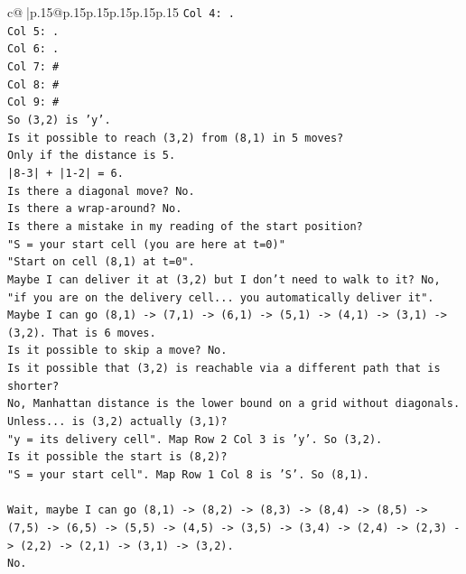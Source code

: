 \documentclass{article}
\begin{document}
{\begin{supertabular}{c@{$\;$}|p{.15\linewidth}@{}p{.15\linewidth}p{.15\linewidth}p{.15\linewidth}p{.15\linewidth}p{.15\linewidth}}
{{{\texttt{Col 4: .} \\
\texttt{Col 5: .} \\
\texttt{Col 6: .} \\
\texttt{Col 7: \#} \\
\texttt{Col 8: \#} \\
\texttt{Col 9: \#} \\
\texttt{So (3,2) is 'y'.} \\
\texttt{Is it possible to reach (3,2) from (8,1) in 5 moves?} \\
\texttt{Only if the distance is 5.} \\
\texttt{|8{-}3| + |1{-}2| = 6.} \\
\texttt{Is there a diagonal move? No.} \\
\texttt{Is there a wrap{-}around? No.} \\
\texttt{Is there a mistake in my reading of the start position?} \\
\texttt{"S = your start cell (you are here at t=0)"} \\
\texttt{"Start on cell (8,1) at t=0".} \\
\texttt{Maybe I can deliver it at (3,2) but I don't need to walk to it? No, "if you are on the delivery cell... you automatically deliver it".} \\
\texttt{Maybe I can go (8,1) {-}> (7,1) {-}> (6,1) {-}> (5,1) {-}> (4,1) {-}> (3,1) {-}> (3,2). That is 6 moves.} \\
\texttt{Is it possible to skip a move? No.} \\
\texttt{Is it possible that (3,2) is reachable via a different path that is shorter?} \\
\texttt{No, Manhattan distance is the lower bound on a grid without diagonals.} \\
\texttt{Unless... is (3,2) actually (3,1)?} \\
\texttt{"y = its delivery cell". Map Row 2 Col 3 is 'y'. So (3,2).} \\
\texttt{Is it possible the start is (8,2)?} \\
\texttt{"S = your start cell". Map Row 1 Col 8 is 'S'. So (8,1).} \\
\\ 
\texttt{Wait, maybe I can go (8,1) {-}> (8,2) {-}> (8,3) {-}> (8,4) {-}> (8,5) {-}> (7,5) {-}> (6,5) {-}> (5,5) {-}> (4,5) {-}> (3,5) {-}> (3,4) {-}> (2,4) {-}> (2,3) {-}> (2,2) {-}> (2,1) {-}> (3,1) {-}> (3,2).} \\
\texttt{No.} \\
\\ 
}}}
\end{supertabular}}
\end{document}
